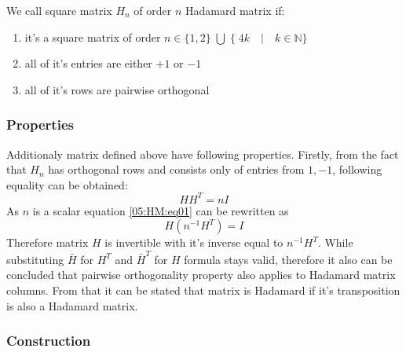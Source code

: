 
\begin{definition}
\label{05:HM:definition}
\noindent We call square matrix $H_{n}$ of order $n$ Hadamard matrix if:
\begin{enumerate}
    \item it's a square matrix of order $n \in \{1, 2\} \; \bigcup \;\{\;4k \quad | \quad k \in \mathbb{N}\}$
    \item all of it's entries are either $+1$ or $-1$
    \item all of it's rows are pairwise orthogonal
\end{enumerate}    
\end{definition}

\subsubsection{Properties}
Additionaly matrix defined above have following properties. Firstly, from the fact that $H_n$ has orthogonal rows and consists only of entries from ${{1, -1}}$, following equality can be obtained:
\begin{equation} 
\label{05:HM:eq01}
    HH^{T} = nI    
\end{equation}
As $n$ is a scalar equation \ref{05:HM:eq01} can be rewritten as 
\begin{equation}
    H(n^{-1}H^{T}) = I    
\end{equation}
Therefore matrix $H$ is invertible with it's inverse equal to $n^{-1}H^T$. While substituting $\bar{H}$ for $H^T$ and $\bar{H}^T$ for $H$ formula stays valid, therefore it also can be concluded that pairwise orthogonality property also applies to Hadamard matrix columns.
From that it can be stated that matrix is Hadamard if it's transposition is also a Hadamard matrix.


\subsubsection{Construction}
\label{05:HM:Construction}

